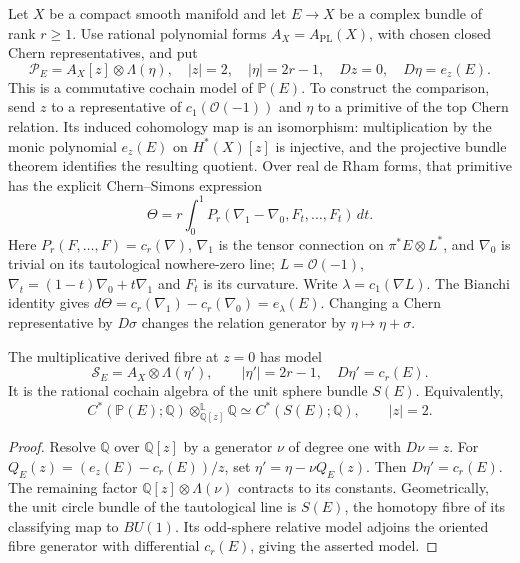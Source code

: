 Let $X$ be a compact smooth manifold and let $E\to X$
be a complex bundle of rank $r\ge1$.
Use rational polynomial forms $A_X=A_{\mathrm{PL}}(X)$,
with chosen closed Chern representatives, and put
\begin{equation}\label{cyprim:eq:projective-model}
 \mathcal P_E=A_X[z]\otimes\Lambda(\eta),
 \quad |z|=2,\quad |\eta|=2r-1,
 \quad Dz=0,\quad D\eta=e_z(E).
\end{equation}
This is a commutative cochain model of $\mathbb P(E)$.
To construct the comparison, send $z$ to a representative
of $c_1(\mathcal O(-1))$ and $\eta$ to a primitive of
the top Chern relation. Its induced cohomology map is
an isomorphism: multiplication by the monic polynomial
$e_z(E)$ on $H^*(X)[z]$ is injective, and the projective
bundle theorem identifies the resulting quotient.
Over real de Rham forms, that primitive has the explicit
Chern--Simons expression
\[
 \Theta=r\int_0^1P_r(\nabla_1-\nabla_0,F_t,\ldots,F_t)\,dt.
\]
Here $P_r(F,\ldots,F)=c_r(\nabla)$, $\nabla_1$ is
the tensor connection on $\pi^*E\otimes L^*$, and
$\nabla_0$ is trivial on its tautological nowhere-zero
line; $L=\mathcal O(-1)$, $\nabla_t=(1-t)\nabla_0+t\nabla_1$
and $F_t$ is its curvature. Write $\lambda=c_1(\nabla L)$.
The Bianchi identity gives
$d\Theta=c_r(\nabla_1)-c_r(\nabla_0)=e_\lambda(E)$.
Changing a Chern representative by $D\sigma$ changes
the relation generator by $\eta\mapsto\eta+\sigma$.

\begin{proposition}\label{cyprim:prop:sphere-fibre}
The multiplicative derived fibre at $z=0$ has model
\[
 \mathcal S_E=A_X\otimes\Lambda(\eta'),
 \qquad |\eta'|=2r-1,\quad D\eta'=c_r(E).
\]
It is the rational cochain algebra of the unit sphere
bundle $S(E)$. Equivalently,
\[
 C^*(\mathbb P(E);\mathbb Q)
       \otimes^{\mathbb L}_{\mathbb Q[z]}\mathbb Q
 \simeq C^*(S(E);\mathbb Q),\qquad |z|=2.
\]
\end{proposition}

\begin{proof}
Resolve $\mathbb Q$ over $\mathbb Q[z]$ by a generator
$\nu$ of degree one with $D\nu=z$. For
$Q_E(z)=(e_z(E)-c_r(E))/z$, set
$\eta'=\eta-\nu Q_E(z)$. Then $D\eta'=c_r(E)$.
The remaining factor $\mathbb Q[z]\otimes\Lambda(\nu)$
contracts to its constants. Geometrically, the unit circle
bundle of the tautological line is $S(E)$, the homotopy
fibre of its classifying map to $BU(1)$. Its odd-sphere
relative model adjoins the oriented fibre generator
with differential $c_r(E)$, giving the asserted model.
\end{proof}

